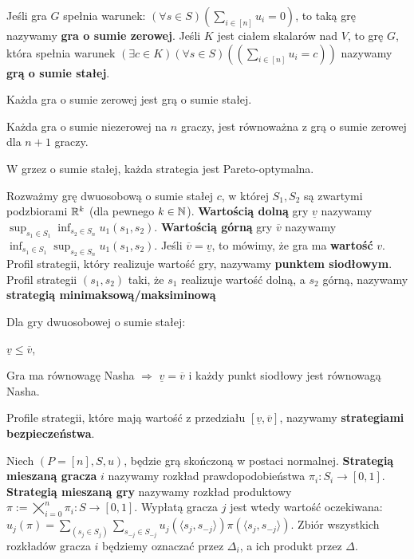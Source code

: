 \begin{definicja}
    Jeśli gra $G$ spełnia warunek: $(\forall s \in S)(\sum\limits_{i \in [n]}u_i = 0)$,
    to taką grę nazywamy \textbf{gra o sumie zerowej}. 
    Jeśli $K$ jest ciałem skalarów nad $V$, to grę $G$, która spełnia warunek 
    $(\exists c \in K)(\forall s \in S)((\sum\limits_{i \in [n]}u_i = c))$
    nazywamy \textbf{grą o sumie stałej}.
\end{definicja}
\begin{fakt}
    Każda gra o sumie zerowej jest grą o sumie stałej.
\end{fakt}
\begin{twierdzenie}
    Każda gra o sumie niezerowej na $n$ graczy, jest równoważna z grą o sumie zerowej dla $n+1$ graczy.
\end{twierdzenie}
\begin{fakt}
    W grzez o sumie stałej, każda strategia jest Pareto-optymalna.
\end{fakt}
\begin{definicja}
    Rozważmy grę dwuosobową o sumie stałej $c$, w której $S_1, S_2$ są zwartymi podzbiorami $\mathbb{R}^k$
    (dla pewnego $k \in \mathbb{N}$).
    \textbf{Wartością dolną} gry $\underline{v}$ nazywamy $\sup_{s_1 \in S_1} \inf_{s_2 \in S_n} u_1(s_1, s_2)$.
    \textbf{Wartością górną} gry $\overline{v}$ nazywamy $\inf_{s_1 \in S_1} \sup_{s_2 \in S_n} u_1(s_1, s_2)$.
    Jeśli $\overline{v} = \underline{v}$, to mówimy, że gra ma \textbf{wartość} $v$.
    Profil strategii, który realizuje wartość gry, nazywamy \textbf{punktem siodłowym}.
    Profil strategii $(s_1, s_2)$ taki, że $s_1$ realizuje wartość dolną, a $s_2$ górną, nazywamy \textbf{strategią minimaksową/maksiminową}
\end{definicja}
\begin{twierdzenie}
    Dla gry dwuosobowej o sumie stałej:
    \begin{enumerate*}[label=\roman*)]
        \item $\underline{v} \leq \overline{v}$,
        \item Gra ma równowagę Nasha $\Rightarrow$ $\underline{v} = \overline{v}$ i każdy punkt siodłowy jest równowagą Nasha.
    \end{enumerate*}
\end{twierdzenie}
\begin{definicja}
    Profile strategii, które mają wartość z przedziału $[\underline{v}, \overline{v}]$, nazywamy \textbf{strategiami bezpieczeństwa}.
\end{definicja}
\begin{definicja}
    Niech $(P = [n], S, u)$, będzie grą skończoną w postaci normalnej.
    \textbf{Strategią mieszaną gracza} $i$ nazywamy rozkład prawdopodobieństwa $\pi_i : S_i \rightarrow [0, 1]$.
    \textbf{Strategią mieszaną gry} nazywamy rozkład produktowy $\pi := \bigtimes_{i=0}^{n}\pi_{i} : S \rightarrow [0, 1]$.
    Wypłatą gracza $j$ jest wtedy wartość oczekiwana: $u_j(\pi) = \sum\limits_{(s_j \in S_j)}\sum\limits_{s_{-j} \in S_{-j}} u_j(\langle s_j, s_{-j} \rangle)\pi(\langle s_j, s_{-j} \rangle)$.
    Zbiór wszystkich rozkładów gracza $i$ będziemy oznaczać przez $\Delta_i$, a ich produkt przez $\Delta$.
\end{definicja}
